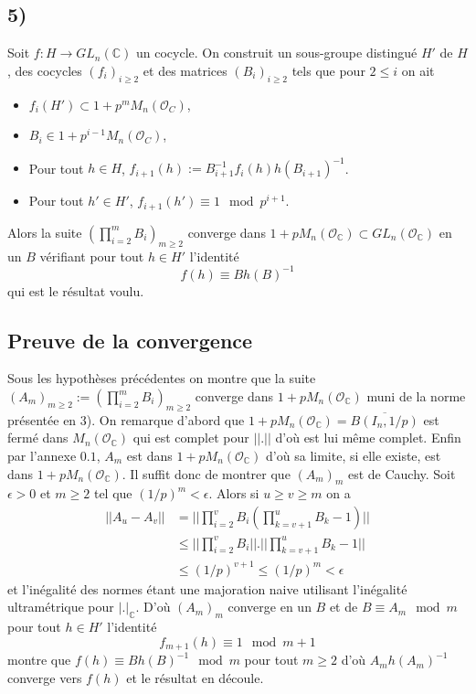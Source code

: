 \documentclass[a4paper,12pt]{article}
\newcommand{\C}{\mathbb{C}}
\newcommand{\Or}{\mathcal{O}}
\theoremstyle{plain}
\theoremstyle{definition}
\theoremstyle{remark}
\begin{document}
\subsection*{5)}
Soit $f\colon H\to GL_n(\C)$ un cocycle. On construit un 
sous-groupe distingué $H'$ de $H$, des
cocycles $(f_i)_{i\geq 2}$ et des matrices $(B_i)_{i\geq 2}$ tels
que pour $2\leq i$ on ait
\begin{itemize}
  \item $f_i(H')\subset 1+p^mM_n(\Or_C)$,
  \item $B_i\in 1+p^{i-1}M_n(\Or_C)$,
  \item Pour tout $h\in H$, $f_{i+1}(h):=B_{i+1}^{-1}f_i(h)h(B_{i+1})^{-1}$.
  \item Pour tout $h'\in H'$, $f_{i+1}(h')\equiv 1\mod p^{i+1}$.
\end{itemize}
Alors la suite $(\prod_{i=2}^m B_i)_{m\geq 2}$ converge dans 
$1+pM_n(\Or_\C)\subset GL_n(\Or_\C)$ en un $B$ vérifiant pour tout
$h\in H'$ l'identité
\[f(h)\equiv Bh(B)^{-1}\]
qui est le résultat voulu.

\subsection*{Preuve de la convergence}
Sous les hypothèses précédentes on montre que la suite 
$(A_m)_{m\geq 2}:=(\prod_{i=2}^mB_i)_{m\geq 2}$ converge dans
$1+pM_n(\Or_\C)$
muni de la norme présentée en 3). On remarque d'abord que 
$1+pM_n(\Or_\C)=\overline{B(I_n,1/p)}$ est fermé dans 
$M_n(\Or_\C)$ qui est complet pour $||.||$ d'où est lui même
complet. Enfin par l'annexe $0.1$, $A_m$ est dans 
$1+pM_n(\Or_\C)$ d'où sa limite, si elle existe, est dans 
$1+pM_n(\Or_\C)$. Il suffit donc de montrer que $(A_m)_m$ est de
Cauchy.
Soit $\epsilon>0$ et $m\geq 2$ tel que $(1/p)^m<\epsilon$. Alors
si $u\geq v\geq m$ on a 
\begin{align*}
||A_u-A_v||&=||\prod_{i=2}^vB_i(\prod_{k=v+1}^uB_k-1)||\\
	   &\leq ||\prod_{i=2}^vB_i||.||\prod_{k=v+1}^uB_k-1||\\
	   &\leq (1/p)^{v+1}\leq (1/p)^m<\epsilon
\end{align*}
et l'inégalité des normes étant une majoration naive utilisant
l'inégalité ultramétrique pour $|.|_\C$. D'où $(A_m)_m$ converge
en un $B$ et de $B\equiv A_m \mod m$ pour tout $h\in H'$ l'identité
\[f_{m+1}(h)\equiv 1\mod m+1\]
montre que $f(h)\equiv Bh(B)^{-1}\mod m$ pour tout $m\geq 2$
d'où $A_mh(A_m)^{-1}$ converge vers $f(h)$
et le résultat en découle.
\end{document}
